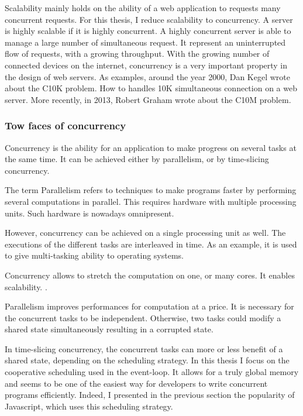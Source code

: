 Scalability mainly holds on the ability of a web application to requests many concurrent requests.
For this thesis, I reduce scalability to concurrency.
A server is highly scalable if it is highly concurrent.
A highly concurrent server is able to manage a large number of simultaneous request.
It represent an uninterrupted flow of requests, with a growing throughput.
With the growing number of connected devices on the internet, concurrency is a very important property in the design of web servers.
As examples, around the year 2000, Dan Kegel wrote about the C10K problem.
How to handles 10K simultaneous connection on a web server.
More recently, in 2013, Robert Graham wrote about the C10M problem.

\subsubsection{Tow faces of concurrency}

Concurrency is the ability for an application to make progress on several tasks at the same time.
It can be achieved either by parallelism, or by time-slicing concurrency.

The term Parallelism refers to techniques to make programs faster by performing several computations in parallel. This requires hardware with multiple processing units. Such hardware is nowadays omnipresent.

However, concurrency can be achieved on a single processing unit as well.
The executions of the different tasks are interleaved in time.
As an example, it is used to give multi-tasking ability to operating systems. 

Concurrency allows to stretch the computation on one, or many cores.
It enables scalability.
.

Parallelism improves performances for computation at a price.
It is necessary for the concurrent tasks to be independent.
Otherwise, two tasks could modify a shared state simultaneously resulting in a corrupted state.

In time-slicing concurrency, the concurrent tasks can more or less benefit of a shared state, depending on the scheduling strategy.
In this thesis I focus on the cooperative scheduling used in the event-loop.
It allows for a truly global memory and seems to be one of the easiest way for developers to write concurrent programs efficiently.
Indeed, I presented in the previous section the popularity of Javascript, which uses this scheduling strategy.

